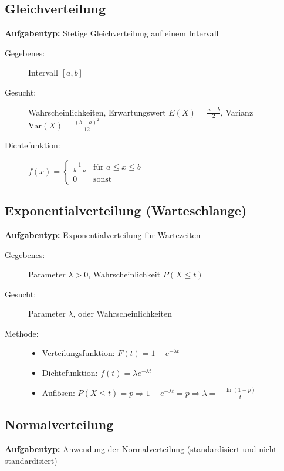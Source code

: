 \documentclass[12pt, a4paper, titlepage, ngerman]{scrartcl}
\begin{document}
\subsection{Gleichverteilung}

\textbf{Aufgabentyp:} Stetige Gleichverteilung auf einem Intervall

\begin{description}
  \item[Gegebenes:] Intervall $[a, b]$
  \item[Gesucht:] Wahrscheinlichkeiten, Erwartungswert $E(X) = \frac{a+b}{2}$, Varianz $\text{Var}(X) = \frac{(b-a)^2}{12}$
  \item[Dichtefunktion:] $f(x) = \begin{cases} \frac{1}{b-a} & \text{für } a \leq x \leq b \\ 0 & \text{sonst} \end{cases}$
\end{description}

\subsection{Exponentialverteilung (Warteschlange)}

\textbf{Aufgabentyp:} Exponentialverteilung für Wartezeiten

\begin{description}
  \item[Gegebenes:] Parameter $\lambda > 0$, Wahrscheinlichkeit $P(X \leq t)$
  \item[Gesucht:] Parameter $\lambda$, oder Wahrscheinlichkeiten
  \item[Methode:] 
    \begin{itemize}
      \item Verteilungsfunktion: $F(t) = 1 - e^{-\lambda t}$
      \item Dichtefunktion: $f(t) = \lambda e^{-\lambda t}$
      \item Auflösen: $P(X \leq t) = p \Rightarrow 1 - e^{-\lambda t} = p \Rightarrow \lambda = -\frac{\ln(1-p)}{t}$
    \end{itemize}
\end{description}

\subsection{Normalverteilung}

\textbf{Aufgabentyp:} Anwendung der Normalverteilung (standardisiert und nicht-standardisiert)
\end{document}
